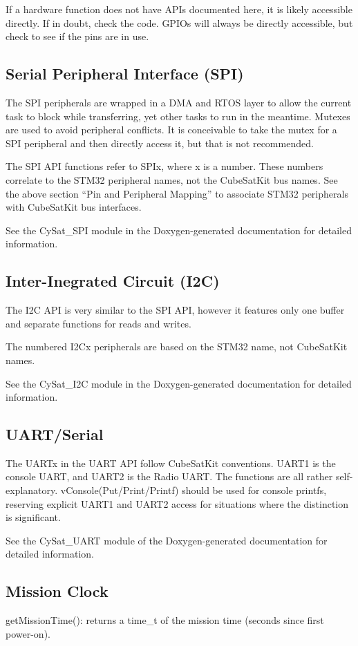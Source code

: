 \documentclass{article}
\begin{document}
If a hardware function does not have APIs documented here, it is likely
accessible directly. If in doubt, check the code. GPIOs will always be directly 
accessible, but check
to see if the pins are in use.

\subsection{Serial Peripheral Interface (SPI)}
The SPI peripherals are wrapped in a DMA and RTOS layer to allow the current
task to block while transferring, yet other tasks to run in the meantime.
Mutexes are used to avoid peripheral conflicts. It is conceivable to take the
mutex for a SPI peripheral and then directly access it, but that is not
recommended.

The SPI API functions refer to SPIx, where x is a number. These numbers
correlate to the STM32 peripheral names, not the CubeSatKit bus names. See
the above section ``Pin and Peripheral Mapping'' to associate STM32 peripherals
with CubeSatKit bus interfaces.

See the CySat\_SPI module in the Doxygen-generated documentation for detailed
information.


\subsection{Inter-Inegrated Circuit (I2C)}
The I2C API is very similar to the SPI API, however it features only one buffer
and separate functions for reads and writes.

The numbered I2Cx peripherals are based on the STM32 name, not CubeSatKit names.

See the CySat\_I2C module in the Doxygen-generated documentation for detailed
information.


\subsection{UART/Serial}
The UARTx in the UART API follow CubeSatKit conventions. UART1 is the console
UART, and UART2 is the Radio UART. The functions are all rather self-explanatory.
vConsole(Put/Print/Printf) should be used for console printfs, reserving explicit UART1
and UART2 access for situations where the distinction is significant.

See the CySat\_UART module of the Doxygen-generated documentation for detailed
information.


\subsection{Mission Clock}
getMissionTime(): returns a time\_t of the mission time (seconds since first
power-on).
\end{document}
